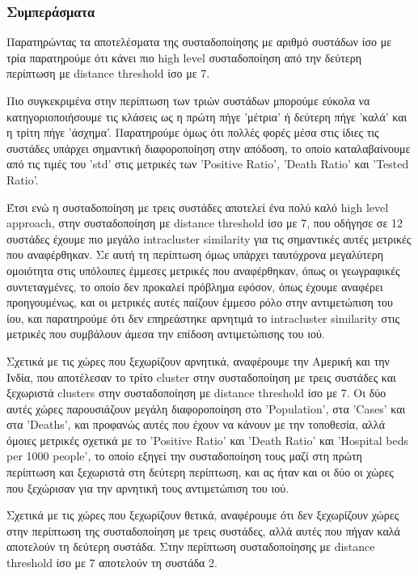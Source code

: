 \documentclass[12pt,a4paper]{article}
\begin{document}
\subsubsection{Συμπεράσματα}

Παρατηρώντας τα αποτελέσματα της συσταδοποίησης με αριθμό συστάδων ίσο με τρία παρατηρούμε ότι κάνει πιο high level συσταδοποίηση από την δεύτερη περίπτωση με distance threshold ίσο με 7.

Πιο συγκεκριμένα στην περίπτωση των τριών συστάδων μπορούμε εύκολα να κατηγοριοποιήσουμε τις κλάσεις ως η πρώτη πήγε 'μέτρια' ή δεύτερη πήγε 'καλά' και η τρίτη πήγε 'άσχημα'. Παρατηρούμε όμως ότι πολλές φορές μέσα στις ίδιες τις συστάδες υπάρχει σημαντική διαφοροποίηση στην απόδοση, το οποίο καταλαβαίνουμε από τις τιμές του 'std' στις μετρικές των 'Positive Ratio', 'Death Ratio' και 'Tested Ratio'.

Έτσι ενώ η συσταδοποίηση με τρεις συστάδες αποτελεί ένα πολύ καλό high level approach, στην συσταδοποίηση με distance threshold ίσο με 7, που οδήγησε σε 12 συστάδες έχουμε πιο μεγάλο intracluster similarity για τις σημαντικές αυτές μετρικές που αναφέρθηκαν. Σε αυτή τη περίπτωση όμως υπάρχει ταυτόχρονα μεγαλύτερη ομοιότητα στις υπόλοιπες έμμεσες μετρικές που αναφέρθηκαν, όπως οι γεωγραφικές συντεταγμένες, το οποίο δεν προκαλεί πρόβλημα εφόσον, όπως έχουμε αναφέρει προηγουμένως, και οι μετρικές αυτές παίζουν έμμεσο ρόλο στην αντιμετώπιση του ίου, και παρατηρούμε ότι δεν επηρεάστηκε αρνητιμά το intracluster similarity στις μετρικές που συμβάλουν άμεσα την επίδοση αντιμετώπισης του ιού.

Σχετικά με τις χώρες που ξεχωρίζουν αρνητικά, αναφέρουμε την Αμερική και την Ινδία, που αποτέλεσαν το τρίτο cluster στην συσταδοποίηση με τρεις συστάδες και ξεχωριστά clusters στην συσταδοποίηση με distance threshold ίσο με 7. Οι δύο αυτές χώρες παρουσιάζουν μεγάλη διαφοροποίηση στο 'Population', στα 'Cases' και στα 'Deaths', και προφανώς αυτές που έχουν να κάνουν με την τοποθεσία, αλλά όμοιες μετρικές σχετικά με το 'Positive Ratio' και 'Death Ratio' και 'Hospital beds per 1000 people', το οποίο εξηγεί την συσταδοποίηση τους μαζί στη πρώτη περίπτωση και ξεχωριστά στη δεύτερη περίπτωση, και ας ήταν και οι δύο οι χώρες που ξεχώρισαν για την αρνητική τους αντιμετώπιση του ιού.

Σχετικά με τις χώρες που ξεχωρίζουν θετικά, αναφέρουμε ότι δεν ξεχωρίζουν χώρες στην περίπτωση της συσταδοποίηση με τρεις συστάδες, αλλά αυτές που πήγαν καλά αποτελούν τη δεύτερη συστάδα. Στην περίπτωση συσταδοποίησης με distance threshold ίσο με 7 αποτελούν τη συστάδα 2.
\end{document}
